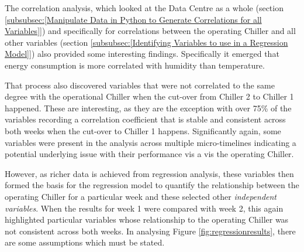 \documentclass[12pt]{scrartcl}
\begin{document}
The correlation analysis, which looked at the Data Centre as a whole (section \ref{subsubsec:[Manipulate Data in Python to Generate Correlations for all Variables]}) and specifically for correlations between the operating Chiller and all other variables (section \ref{subsubsec:[Identifying Variables to use in a Regression Model]}) also provided some interesting findings. Specifically it emerged that energy consumption is more correlated with humidity than temperature.

That process also discovered variables that were not correlated to the same degree with the operational Chiller when the cut-over from Chiller 2 to Chiller 1 happened. These are interesting, as they are the exception with over 75\% of the variables recording a correlation coefficient that is stable and consistent across both weeks when the cut-over to Chiller 1 happens. Significantly again, some variables were present in the analysis across multiple micro-timelines indicating a potential underlying issue with their performance vis a vis the operating Chiller.     

However, as richer data is achieved from regression analysis, these variables then formed the basis for the regression model to quantify the relationship between the operating Chiller for a particular week and these selected other \textit{independent variables}. When the results for week 1 were compared with week 2, this again highlighted particular variables whose relationship to the operating Chiller was not consistent across both weeks. In analysing Figure \ref{fig:regressionresults}, there are some assumptions which must be stated. 
\end{document}
